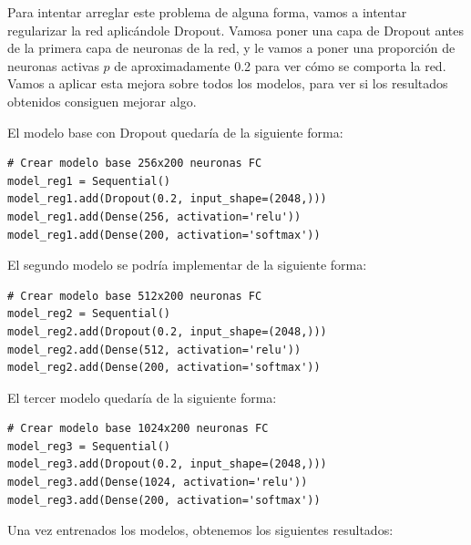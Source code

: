 \documentclass[11pt,a4paper]{article}
\begin{document}
Para intentar arreglar este problema de alguna forma, vamos a intentar regularizar la
red aplicándole Dropout. Vamosa poner una capa de Dropout antes de la primera capa de
neuronas de la red, y le vamos a poner una proporción de neuronas activas $p$ de aproximadamente
0.2 para ver cómo se comporta la red. Vamos a aplicar esta mejora sobre todos los modelos,
para ver si los resultados obtenidos consiguen mejorar algo.

El modelo base con Dropout quedaría de la siguiente forma:

\begin{lstlisting}
# Crear modelo base 256x200 neuronas FC
model_reg1 = Sequential()
model_reg1.add(Dropout(0.2, input_shape=(2048,)))
model_reg1.add(Dense(256, activation='relu'))
model_reg1.add(Dense(200, activation='softmax'))
\end{lstlisting}

El segundo modelo se podría implementar de la siguiente forma:

\begin{lstlisting}
# Crear modelo base 512x200 neuronas FC
model_reg2 = Sequential()
model_reg2.add(Dropout(0.2, input_shape=(2048,)))
model_reg2.add(Dense(512, activation='relu'))
model_reg2.add(Dense(200, activation='softmax'))
\end{lstlisting}

El tercer modelo quedaría de la siguiente forma:

\begin{lstlisting}
# Crear modelo base 1024x200 neuronas FC
model_reg3 = Sequential()
model_reg3.add(Dropout(0.2, input_shape=(2048,)))
model_reg3.add(Dense(1024, activation='relu'))
model_reg3.add(Dense(200, activation='softmax'))
\end{lstlisting}

Una vez entrenados los modelos, obtenemos los siguientes resultados:
\end{document}

